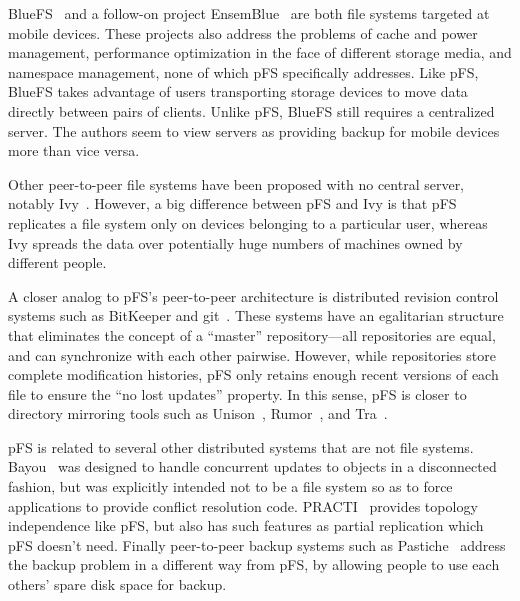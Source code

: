 BlueFS~\cite{nightingale:bluefs} and a follow-on project
EnsemBlue~\cite{nightingale:bluefs} are both file systems targeted at
mobile devices.  These projects also address the problems of cache and
power management, performance optimization in the face of different
storage media, and namespace management, none of which pFS
specifically addresses.  Like pFS, BlueFS takes advantage of users
transporting storage devices to move data directly between pairs of
clients.  Unlike pFS, BlueFS still requires a centralized server.  The
authors seem to view servers as providing backup for mobile devices
more than vice versa.

Other peer-to-peer file systems have been proposed with no central
server, notably Ivy~\cite{muthitacharoen:ivy}.  However, a big
difference between pFS and Ivy is that pFS replicates a file system
only on devices belonging to a particular user, whereas Ivy spreads
the data over potentially huge numbers of machines owned by different
people.

A closer analog to pFS's peer-to-peer architecture is distributed
revision control systems such as BitKeeper and git~\cite{git}.  These
systems have an egalitarian structure that eliminates the concept of a
``master'' repository---all repositories are equal, and can
synchronize with each other pairwise.  However, while repositories
store complete modification histories, pFS only retains enough recent
versions of each file to ensure the ``no lost updates'' property.  In
this sense, pFS is closer to directory mirroring tools such as
Unison~\cite{balasubramanian:unison}, Rumor~\cite{guy:rumor}, and
Tra~\cite{cox:tra}.

pFS is related to several other distributed systems that are not file
systems.  Bayou~\cite{petersen:flexible-update} was designed to handle
concurrent updates to objects in a disconnected fashion, but was
explicitly intended not to be a file system so as to force
applications to provide conflict resolution code.
PRACTI~\cite{belaramani:practi} provides topology independence like
pFS, but also has such features as partial replication which pFS
doesn't need.  Finally peer-to-peer backup systems such as
Pastiche~\cite{cox:pastiche} \cite{nguyen:friendstore} address the
backup problem in a different way from pFS, by allowing people to use
each others' spare disk space for backup.



